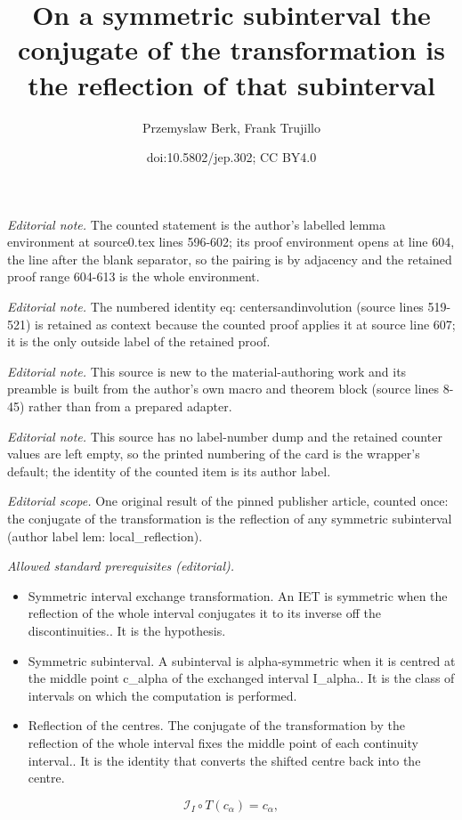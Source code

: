 \documentclass[10pt,a4paper]{article}
\title{On a symmetric subinterval the conjugate of the transformation is the reflection of that subinterval}
\author{Przemyslaw Berk, Frank Trujillo}
\date{doi:10.5802/jep.302; CC BY4.0}
\theoremstyle{plain}
\theoremstyle{definition}
\begin{document}
\maketitle
\noindent\textit{Editorial note.} The counted statement is the author's labelled lemma environment at source0.tex lines 596-602; its proof environment opens at line 604, the line after the blank separator, so the pairing is by adjacency and the retained proof range 604-613 is the whole environment.\par\medskip
\noindent\textit{Editorial note.} The numbered identity eq: centersandinvolution (source lines 519-521) is retained as context because the counted proof applies it at source line 607; it is the only outside label of the retained proof.\par\medskip
\noindent\textit{Editorial note.} This source is new to the material-authoring work and its preamble is built from the author's own macro and theorem block (source lines 8-45) rather than from a prepared adapter.\par\medskip
\noindent\textit{Editorial note.} This source has no label-number dump and the retained counter values are left empty, so the printed numbering of the card is the wrapper's default; the identity of the counted item is its author label.\par\medskip
\noindent\textit{Editorial scope.} One original result of the pinned publisher article, counted once: the conjugate of the transformation is the reflection of any symmetric subinterval (author label lem: local\_reflection).\par\medskip
\noindent\textit{Allowed standard prerequisites (editorial).}\begin{itemize}
\item Symmetric interval exchange transformation. An IET is symmetric when the reflection of the whole interval conjugates it to its inverse off the discontinuities.. It is the hypothesis.
\item Symmetric subinterval. A subinterval is alpha-symmetric when it is centred at the middle point c\_alpha of the exchanged interval I\_alpha.. It is the class of intervals on which the computation is performed.
\item Reflection of the centres. The conjugate of the transformation by the reflection of the whole interval fixes the middle point of each continuity interval.. It is the identity that converts the shifted centre back into the centre.
\end{itemize}\medskip
\begin{equation}\label{eq: centersandinvolution}
\mathcal{I}_I\circ T(c_{\alpha})=c_{\alpha},
\end{equation}
\end{document}
